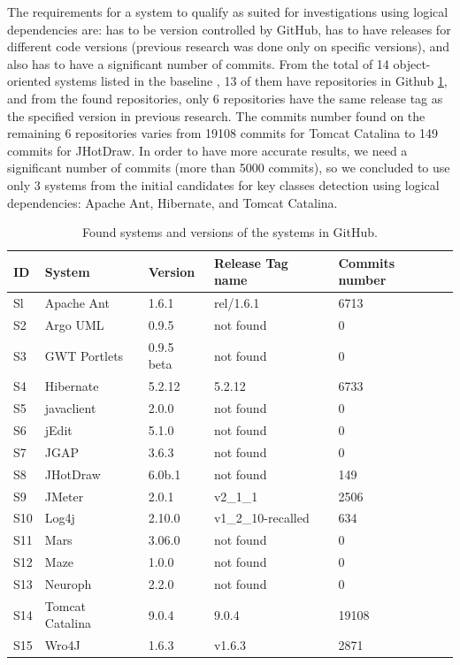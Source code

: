 \documentclass[runningheads]{comsis2}
\begin{document}
The requirements for a system to qualify as suited for investigations using logical dependencies are: has to be version controlled by GitHub, has to have releases for different code versions (previous research was done only on specific versions), and also has to have a significant number of commits. 
From the total of 14 object-oriented systems listed in the baseline \cite{Finding-key-classes}, 13 of them have repositories in Github \ref{tab:gitfoundsystems}, and from the found repositories, only 6 repositories have the same release tag as the specified version in previous research.
The commits number found on the remaining 6 repositories varies from 19108 commits for Tomcat Catalina to 149 commits for JHotDraw. In order to have more accurate results, we need a significant number of commits (more than 5000 commits), so we concluded to use only 3 systems from the initial candidates for key classes detection using logical dependencies: Apache Ant, Hibernate, and Tomcat Catalina.  

\begin{table}
\renewcommand{\arraystretch}{1}
\caption{Found systems and versions of the systems in GitHub. }
\label{tab:gitfoundsystems}
\centering
\begin{tabular}{lllll}
\hline
ID	&	System	&	Version	&	Release Tag name	&	Commits number	\\
\hline
Sl	&	Apache Ant	&	1.6.1	&	rel/1.6.1	&	6713	\\
S2	&	Argo UML	&	0.9.5	&	not found	&	0	\\
S3	&	GWT Portlets	&	0.9.5 beta	&	not found	&	0	\\
S4	&	Hibernate 	&	5.2.12	&	5.2.12	&	6733	\\
S5	&	javaclient	&	2.0.0	&	not found	&	0	\\
S6	&	jEdit	&	5.1.0	&	not found	&	0	\\
S7	&	JGAP	&	3.6.3	&	not found	&	0	\\
S8	&	JHotDraw	&	6.0b.1	&	not found	&	149	\\
S9	&	JMeter	&	2.0.1	&	v2\_1\_1	&	2506	\\
S10	&	Log4j	&	2.10.0	&	v1\_2\_10-recalled	&	634	\\
S11	&	Mars	&	3.06.0	&	not found	&	0	\\
S12	&	Maze	&	1.0.0	&	not found	&	0	\\
S13	&	Neuroph	&	2.2.0	&	not found	&	0	\\
S14	&	Tomcat Catalina	&	9.0.4	&	9.0.4	&	19108	\\
S15	&	Wro4J	&	1.6.3	&	v1.6.3	&	2871	\\
\hline
\end{tabular}
\end{table}
\end{document}
